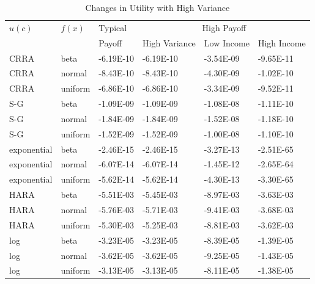 \documentclass[letterpaper,12pt]{article}
\numberwithin{equation}{section}
\numberwithin{figure}{section}
\numberwithin{table}{section}
\begin{document}
\begin{spacing}{1.5}
	\begin{table}[ht] 
		\caption{Changes in Utility with High Variance}
		\label{tab_lottery1}
		\centering
		\small
		\begin{tabular}{|lll|lll|}
		    \hline
			$u(c)$ & $f(x)$ & Typical & \multicolumn{3}{c}{High Payoff} \\
			& & Payoff & High Variance & Low Income & High Income \\
			\hline
			CRRA & beta & -6.19E-10 & -6.19E-10 & -3.54E-09 & -9.65E-11 \\
			CRRA & normal & -8.43E-10 & -8.43E-10 & -4.30E-09 & -1.02E-10 \\
			CRRA & uniform & -6.86E-10 & -6.86E-10 & -3.34E-09 & -9.52E-11 \\
			\hline
			S-G & beta & -1.09E-09 & -1.09E-09 & -1.08E-08 & -1.11E-10 \\
			S-G & normal & -1.84E-09 & -1.84E-09 & -1.52E-08 & -1.18E-10 \\
			S-G & uniform & -1.52E-09 & -1.52E-09 & -1.00E-08 & -1.10E-10 \\
			\hline
			exponential & beta & -2.46E-15 & -2.46E-15 & -3.27E-13 & -2.51E-65 \\
			exponential & normal & -6.07E-14 & -6.07E-14 & -1.45E-12 & -2.65E-64 \\
			exponential & uniform & -5.62E-14 & -5.62E-14 & -4.30E-13 & -3.30E-65 \\
			\hline
			HARA & beta & -5.51E-03 & -5.45E-03 & -8.97E-03 & -3.63E-03 \\
			HARA & normal & -5.76E-03 & -5.71E-03 & -9.41E-03 & -3.68E-03 \\
			HARA & uniform & -5.30E-03 & -5.25E-03 & -8.81E-03 & -3.62E-03 \\
			\hline
			log & beta & -3.23E-05 & -3.23E-05 & -8.39E-05 & -1.39E-05 \\
			log & normal & -3.62E-05 & -3.62E-05 & -9.25E-05 & -1.43E-05 \\
			log & uniform & -3.13E-05 & -3.13E-05 & -8.11E-05 & -1.38E-05 \\
			\hline
		\end{tabular}
	\end{table}


\end{spacing}
\end{document}
